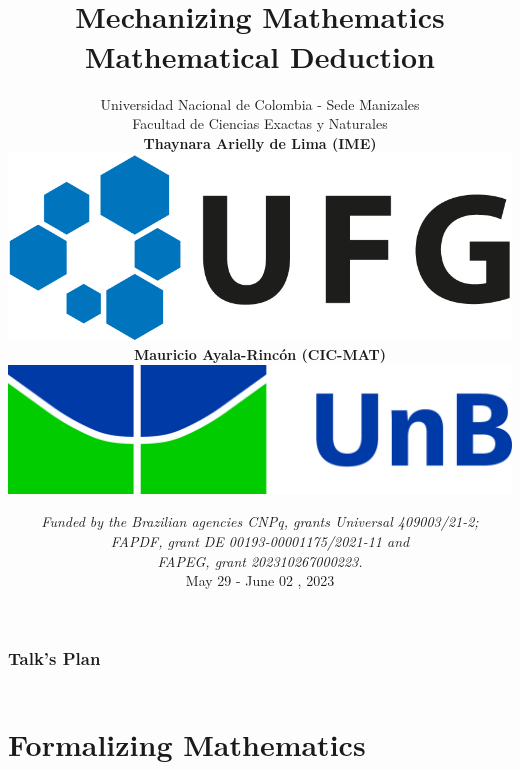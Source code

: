 \documentclass[10pt]{beamer}
\title
[Mechanizing Mathematics]
{\vspace{-5mm}
\\%
{\bf\Large Mechanizing Mathematics}\\
{\large Mathematical Deduction} \vspace{-.1cm}}
\author[M. Ayala-Rinc\'on (UnB) \& T. A. de Lima (UFG)]
{Universidad Nacional de Colombia - Sede Manizales \\
Facultad de Ciencias Exactas y Naturales\\[6mm]
\textbf{Thaynara Arielly de Lima
  (IME)}   \includegraphics[scale=.18]{ufg.png}\\
\textbf{Mauricio Ayala-Rinc\'on (CIC-MAT)} \includegraphics[scale=.03]{unb.jpg}
\vspace{-.8cm}}
\date[Universidad Nacional de Colombia - Sede Manizales]{{\scriptsize\it Funded by the Brazilian agencies CNPq, grants Universal 409003/21-2; \\ FAPDF, grant DE 00193-00001175/2021-11 and \\ FAPEG, grant 202310267000223.}
\\ May 29 - June 02 ,
  2023}
\begin{document}
\begin{frame}
\maketitle
\end{frame}
\begin{frame}
\frametitle{Talk's Plan}
\begin{columns}
\begin{column}{10cm}
\tableofcontents
\end{column}
\end{columns}
\end{frame}











\section{Formalizing Mathematics}
\end{document}
